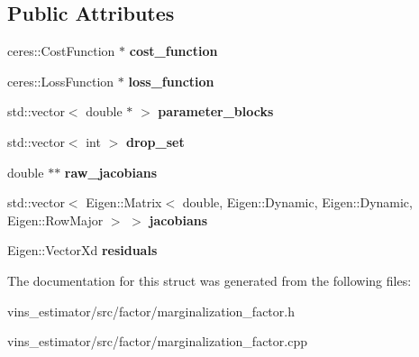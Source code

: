 \subsection*{Public Attributes}
\begin{DoxyCompactItemize}
\item 
\mbox{\label{structResidualBlockInfo_a489967fa38c4a2de5c647d5a02a484b5}} 
ceres\+::\+Cost\+Function $\ast$ {\bfseries cost\+\_\+function}
\item 
\mbox{\label{structResidualBlockInfo_a8782729bdb14584de4a98324f3e58db1}} 
ceres\+::\+Loss\+Function $\ast$ {\bfseries loss\+\_\+function}
\item 
\mbox{\label{structResidualBlockInfo_a85a4ecd14c23fb2809a12e39eab3e68b}} 
std\+::vector$<$ double $\ast$ $>$ {\bfseries parameter\+\_\+blocks}
\item 
\mbox{\label{structResidualBlockInfo_abe83d95bd32e05dfccf3a68318c47d5b}} 
std\+::vector$<$ int $>$ {\bfseries drop\+\_\+set}
\item 
\mbox{\label{structResidualBlockInfo_a7606a60924d7a3e76c3faaa5f4bfea3b}} 
double $\ast$$\ast$ {\bfseries raw\+\_\+jacobians}
\item 
\mbox{\label{structResidualBlockInfo_acbc028b6c44f6ccd50c75b77f44b357b}} 
std\+::vector$<$ Eigen\+::\+Matrix$<$ double, Eigen\+::\+Dynamic, Eigen\+::\+Dynamic, Eigen\+::\+Row\+Major $>$ $>$ {\bfseries jacobians}
\item 
\mbox{\label{structResidualBlockInfo_ae46cb3c6f4549dd39bad1f04b7d0b72a}} 
Eigen\+::\+Vector\+Xd {\bfseries residuals}
\end{DoxyCompactItemize}


The documentation for this struct was generated from the following files\+:\begin{DoxyCompactItemize}
\item 
vins\+\_\+estimator/src/factor/marginalization\+\_\+factor.\+h\item 
vins\+\_\+estimator/src/factor/marginalization\+\_\+factor.\+cpp\end{DoxyCompactItemize}
